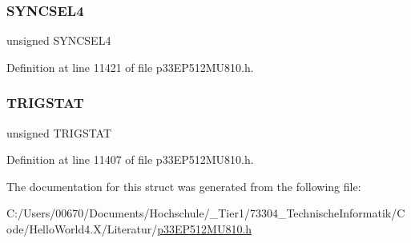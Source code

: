 \subsubsection{\texorpdfstring{S\+Y\+N\+C\+S\+E\+L4}{SYNCSEL4}}
{\footnotesize\ttfamily unsigned S\+Y\+N\+C\+S\+E\+L4}



Definition at line 11421 of file p33\+E\+P512\+M\+U810.\+h.

\mbox{\label{structtag_o_c5_c_o_n2_b_i_t_s_ab379549de54ac93ad4aa73686c34cb7c}} 
\subsubsection{\texorpdfstring{T\+R\+I\+G\+S\+T\+AT}{TRIGSTAT}}
{\footnotesize\ttfamily unsigned T\+R\+I\+G\+S\+T\+AT}



Definition at line 11407 of file p33\+E\+P512\+M\+U810.\+h.



The documentation for this struct was generated from the following file\+:\begin{DoxyCompactItemize}
\item 
C\+:/\+Users/00670/\+Documents/\+Hochschule/\+\_\+\+Tier1/73304\+\_\+\+Technische\+Informatik/\+Code/\+Hello\+World4.\+X/\+Literatur/\hyperlink{p33_e_p512_m_u810_8h}{p33\+E\+P512\+M\+U810.\+h}\end{DoxyCompactItemize}
